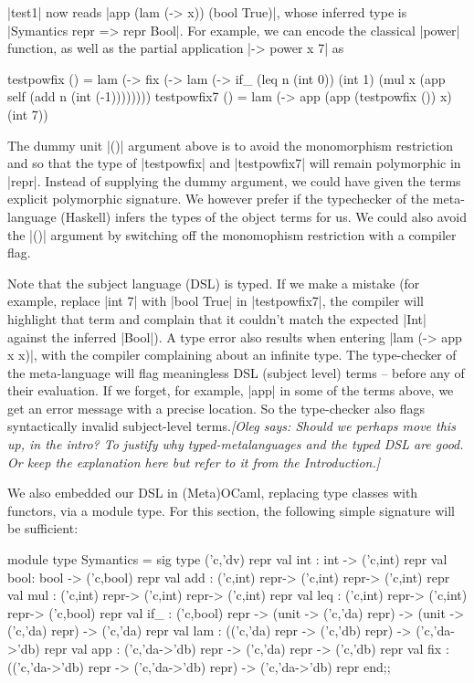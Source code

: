 \documentclass[preprint]{sigplanconf}
\newcommand{\oleg}[1]{{\it [Oleg says: #1]}}
\begin{document}
|test1| now reads |app (lam (\x -> x)) (bool True)|,
whose inferred type is |Symantics repr => repr Bool|.
For example, we can encode the classical |power| function, as well
as the partial application |\x -> power x 7| as

\begin{code}
testpowfix () = 
  lam (\x -> fix (\self -> lam (\n ->
        if_ (leq n (int 0)) (int 1)
            (mul x (app self (add n (int (-1))))))))
testpowfix7 () = 
  lam (\x -> app (app (testpowfix ()) x) (int 7))
\end{code}
The dummy unit |()| argument above is to avoid the monomorphism
restriction and so that the type of |testpowfix| and |testpowfix7|
will remain polymorphic in |repr|. Instead of supplying the dummy
argument, we could have given the terms explicit polymorphic
signature.  We however prefer if the typechecker of the meta-language
(Haskell) infers the types of the object terms for us. We could also
avoid the |()| argument by switching off the monomophism restriction
with a compiler flag.

Note that the subject language (DSL) is typed. If we make a mistake
(for example, replace |int 7| with |bool True| in |testpowfix7|, the
compiler will highlight that term and complain that it couldn't match
the expected |Int| against the inferred |Bool|). A type error
also results when entering |lam (\x -> app x x)|, with the compiler
complaining about an infinite type. The type-checker of the
meta-language will flag meaningless DSL (subject level) terms --
before any of their evaluation. If we forget, for example, |app| in
some of the terms above, we get an error message with a precise
location. So the type-checker also flags syntactically invalid
subject-level terms.\oleg{Should we perhaps move this up, in the
  intro? To justify why typed-metalanguages and the typed DSL are
  good. Or keep the explanation here but refer to it from the Introduction.}

We also embedded our DSL in (Meta)OCaml, replacing type classes with
functors, via a module type.  For this section, the following simple
signature will be sufficient:

\begin{code}
module type Symantics = sig
  type ('c,'dv) repr
  val int : int  -> ('c,int) repr
  val bool: bool -> ('c,bool) repr
  val add : ('c,int) repr-> ('c,int) repr-> ('c,int) repr
  val mul : ('c,int) repr-> ('c,int) repr-> ('c,int) repr
  val leq : ('c,int) repr-> ('c,int) repr-> ('c,bool) repr
  val if_ : ('c,bool) repr ->
             (unit -> ('c,'da) repr) ->
             (unit -> ('c,'da) repr) -> ('c,'da) repr 
  val lam : (('c,'da) repr -> ('c,'db) repr) 
          -> ('c,'da->'db) repr
  val app : ('c,'da->'db) repr
    -> ('c,'da) repr -> ('c,'db) repr
  val fix : (('c,'da->'db) repr -> ('c,'da->'db) repr) 
            -> ('c,'da->'db) repr
end;;
\end{code}
\end{document}
